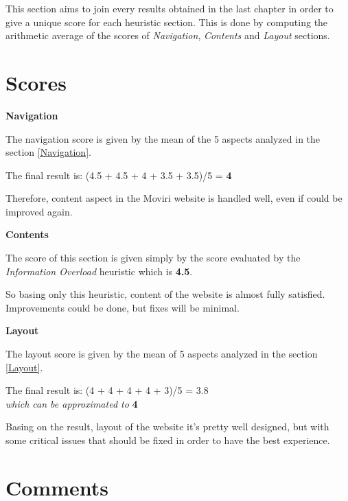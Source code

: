 This section aims to join every results obtained in the last chapter in order to give a unique score for each heuristic section. This is done by computing the arithmetic average of the scores of \textit{Navigation}, \textit{Contents} and \textit{Layout} sections.\par
\bigskip
\section{Scores}
\textbf{Navigation}\par
The navigation score is given by the mean of the 5 aspects analyzed in the section \ref{Navigation}. \par 
The final result is: 
(4.5 + 4.5 + 4 + 3.5 + 3.5)/5 = \textbf{4}\par
Therefore, content aspect in the Moviri website is handled well, even if could be improved again.
\par\medskip

\textbf{Contents}\par
The score of this section is given simply by the score evaluated by the \textit{Information Overload} heuristic which is \textbf{4.5}. \par
So basing only this heuristic, content of the website is almost fully satisfied. Improvements could be done, but fixes will be minimal.
\par\medskip

\textbf{Layout}\par
The layout score is given by the mean of 5 aspects analyzed in the section \ref{Layout}. \par
The final result is: 
(4 + 4 + 4 + 4 + 3)/5 = 3.8 \\
\textit{which can be approximated to} \textbf{4}\par
Basing on the result, layout of the website it's pretty well designed, but with some critical issues that should be fixed in order to have the best experience.

\section{Comments}
